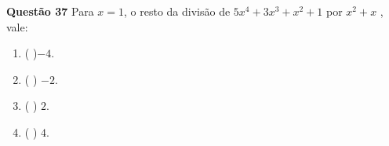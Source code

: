 {\bf Questão 37} 
Para $x= 1$, o resto da divisão de $5x^4 + 3x^3 + x^2 + 1$ por $x^2 + x$ , vale:
\begin{multicols}{4}
\begin{enumerate}
		\item ( )$-4.$
		\item ( ) $-2.$
		\item ( ) $2.$
		\item ( ) $4.$
\end{enumerate}
\end{multicols}
